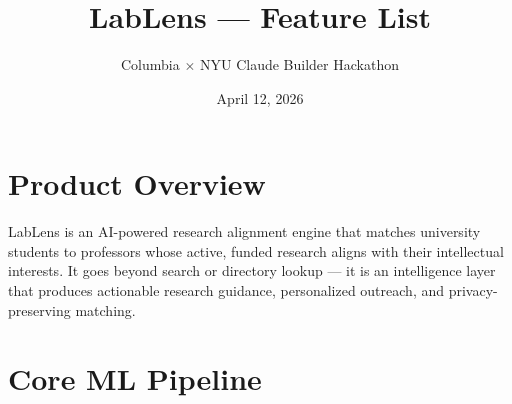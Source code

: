 \documentclass{article}
\title{\textbf{LabLens — Feature List}}
\author{Columbia $\times$ NYU Claude Builder Hackathon}
\date{April 12, 2026}
\begin{document}
\maketitle

\section{Product Overview}

LabLens is an AI-powered research alignment engine that matches university students
to professors whose active, funded research aligns with their intellectual interests.
It goes beyond search or directory lookup — it is an intelligence layer that produces
actionable research guidance, personalized outreach, and privacy-preserving matching.

\section{Core ML Pipeline}
\end{document}
